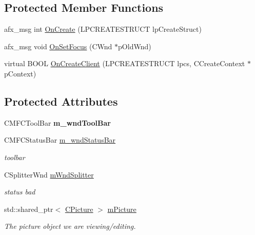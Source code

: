 \subsection*{Protected Member Functions}
\begin{DoxyCompactItemize}
\item 
afx\+\_\+msg int \hyperlink{class_c_main_frame_a48666466fd37412fcaeff75c3b12e0ed}{On\+Create} (L\+P\+C\+R\+E\+A\+T\+E\+S\+T\+R\+U\+C\+T lp\+Create\+Struct)
\item 
afx\+\_\+msg void \hyperlink{class_c_main_frame_adc353a3d1fc497fbc009b6d9e6914a82}{On\+Set\+Focus} (C\+Wnd $\ast$p\+Old\+Wnd)
\item 
virtual B\+O\+O\+L \hyperlink{class_c_main_frame_ac863d694fd3637d492ef97396defbd8e}{On\+Create\+Client} (L\+P\+C\+R\+E\+A\+T\+E\+S\+T\+R\+U\+C\+T lpcs, C\+Create\+Context $\ast$p\+Context)
\end{DoxyCompactItemize}
\subsection*{Protected Attributes}
\begin{DoxyCompactItemize}
\item 
\hypertarget{class_c_main_frame_ac8558942627d1502b5095e736840a1f3}{C\+M\+F\+C\+Tool\+Bar {\bfseries m\+\_\+wnd\+Tool\+Bar}}\label{class_c_main_frame_ac8558942627d1502b5095e736840a1f3}

\item 
\hypertarget{class_c_main_frame_a5842bded00e9137fbbf77343b99863be}{C\+M\+F\+C\+Status\+Bar \hyperlink{class_c_main_frame_a5842bded00e9137fbbf77343b99863be}{m\+\_\+wnd\+Status\+Bar}}\label{class_c_main_frame_a5842bded00e9137fbbf77343b99863be}

\begin{DoxyCompactList}\small\item\em toolbar \end{DoxyCompactList}\item 
\hypertarget{class_c_main_frame_a1d68466db594c4bebf41f707bc0a0647}{C\+Splitter\+Wnd \hyperlink{class_c_main_frame_a1d68466db594c4bebf41f707bc0a0647}{m\+Wnd\+Splitter}}\label{class_c_main_frame_a1d68466db594c4bebf41f707bc0a0647}

\begin{DoxyCompactList}\small\item\em status bad \end{DoxyCompactList}\item 
std\+::shared\+\_\+ptr$<$ \hyperlink{class_c_picture}{C\+Picture} $>$ \hyperlink{class_c_main_frame_aee7250305e9d4adb463024fe090a2c10}{m\+Picture}
\begin{DoxyCompactList}\small\item\em The picture object we are viewing/editing. \end{DoxyCompactList}\end{DoxyCompactItemize}


